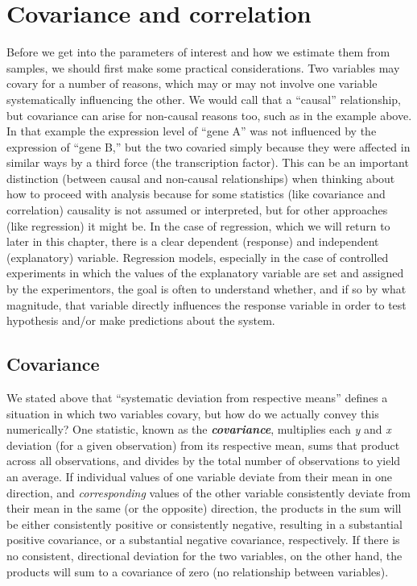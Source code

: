 \documentclass[
]{book}
\begin{document}
\hypertarget{covariance-and-correlation}{%
\section{Covariance and correlation}\label{covariance-and-correlation}}

Before we get into the parameters of interest and how we estimate them from samples, we should first make some practical considerations. Two variables may covary for a number of reasons, which may or may not involve one variable systematically influencing the other. We would call that a ``causal'' relationship, but covariance can arise for non-causal reasons too, such as in the example above. In that example the expression level of ``gene A'' was not influenced by the expression of ``gene B,'' but the two covaried simply because they were affected in similar ways by a third force (the transcription factor). This can be an important distinction (between causal and non-causal relationships) when thinking about how to proceed with analysis because for some statistics (like covariance and correlation) causality is not assumed or interpreted, but for other approaches (like regression) it might be. In the case of regression, which we will return to later in this chapter, there is a clear dependent (response) and independent (explanatory) variable. Regression models, especially in the case of controlled experiments in which the values of the explanatory variable are set and assigned by the experimentors, the goal is often to understand whether, and if so by what magnitude, that variable directly influences the response variable in order to test hypothesis and/or make predictions about the system.

\hypertarget{covariance}{%
\subsection{Covariance}\label{covariance}}

We stated above that ``systematic deviation from respective means'' defines a situation in which two variables covary, but how do we actually convey this numerically? One statistic, known as the \textbf{\emph{covariance}}, multiplies each \emph{y} and \emph{x} deviation (for a given observation) from its respective mean, sums that product across all observations, and divides by the total number of observations to yield an average. If individual values of one variable deviate from their mean in one direction, and \emph{corresponding} values of the other variable consistently deviate from their mean in the same (or the opposite) direction, the products in the sum will be either consistently positive or consistently negative, resulting in a substantial positive covariance, or a substantial negative covariance, respectively. If there is no consistent, directional deviation for the two variables, on the other hand, the products will sum to a covariance of zero (no relationship between variables).\\
\end{document}

